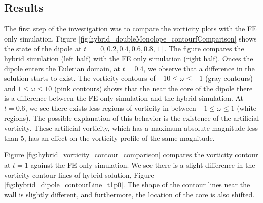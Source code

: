 
\subsection{Results}

The first step of the investigation was to compare the vorticity plots with the FE only simulation. Figure \ref{fig:hybrid_doubleMonolope_contourfComparison} shows the state of the dipole at $t=[0,0.2,0.4,0.6,0.8,1]$. The figure compares the hybrid simulation (left half) with the FE only simulation (right half). Onces the dipole enters the Eulerian domain, at $t=0.4$, we observe that a difference in the solution starts to exist. The vorticity contours of $-10\leqslant \omega\leqslant-1$ (gray contours) and  $1\leqslant \omega\leqslant10$ (pink contours) shows that the near the core of the dipole there is a difference between the FE only simulation and the hybrid simulation. At $t=0.6$, we see there exists less regions of vorticity in between $-1\leqslant\omega\leqslant1$ (white regions). The possible explanation of this behavior is the existence of the artificial vorticity. These artificial vorticity, which has a maximum absolute magnitude less than 5, has an effect on the vorticity profile of the same magnitude.


Figure \ref{fig:hybrid_vorticity_contour_comparison} compares the vorticity contour at $t=1$ against the FE only simulation. We see there is a slight difference in the vorticity contour lines of hybrid solution, Figure \ref{fig:hybrid_dipole_contourLine_t1p0}. The shape of the contour lines near the wall is slightly different, and furthermore, the location of the core is also shifted.

